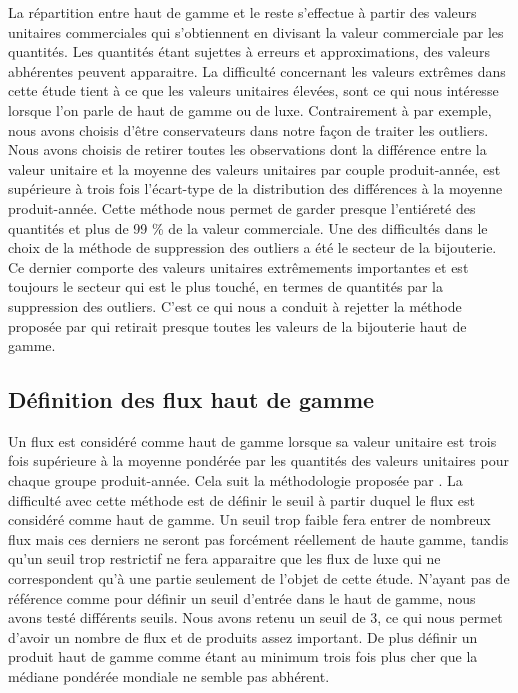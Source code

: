 \documentclass[french,10pt,a4paper]{article}
\begin{document}
La répartition entre haut de gamme et le reste s'effectue à partir des valeurs unitaires commerciales qui s'obtiennent en divisant la valeur commerciale par les quantités. Les quantités étant sujettes à erreurs et approximations, des valeurs abhérentes peuvent apparaitre. La difficulté concernant les valeurs extrêmes dans cette étude tient à ce que les valeurs unitaires élevées, sont ce qui nous intéresse lorsque l'on parle de haut de gamme ou de luxe. Contrairement à \cite{Fontagne2013} par exemple, nous avons choisis d'être conservateurs dans notre façon de traiter les outliers. Nous avons choisis de retirer toutes les observations dont la différence entre la valeur unitaire et la moyenne des valeurs unitaires par couple produit-année, est supérieure à trois fois l'écart-type de la distribution des différences à la moyenne produit-année. Cette méthode nous permet de garder presque l'entiéreté des quantités et plus de 99 \% de la valeur commerciale. Une des difficultés dans le choix de la méthode de suppression des outliers a été le secteur de la bijouterie. Ce dernier comporte des valeurs unitaires extrêmements importantes et est toujours le secteur qui est le plus touché, en termes de quantités par la suppression des outliers. C'est ce qui nous a conduit à rejetter la méthode proposée par \cite{Hallak2006} qui retirait presque toutes les valeurs de la bijouterie haut de gamme. 


\subsection{Définition des flux haut de gamme}

Un flux est considéré comme haut de gamme lorsque sa valeur unitaire est trois fois supérieure à la moyenne pondérée par les quantités des valeurs unitaires pour chaque groupe produit-année. Cela suit la méthodologie proposée par \cite{Fontagne2007}. La difficulté avec cette méthode est de définir le seuil à partir duquel le flux est considéré comme haut de gamme. Un seuil trop faible fera entrer de nombreux flux mais ces derniers ne seront pas forcément réellement de haute gamme, tandis qu'un seuil trop restrictif ne fera apparaitre que les flux de luxe qui ne correspondent qu'à une partie seulement de l'objet de cette étude. N'ayant pas de référence comme \cite{Martin2015} pour définir un seuil d'entrée dans le haut de gamme, nous avons testé différents seuils. Nous avons retenu un seuil de 3, ce qui nous permet d'avoir un nombre de flux et de produits assez important. De plus définir un produit haut de gamme comme étant au minimum trois fois plus cher que la médiane pondérée mondiale ne semble pas abhérent.
\end{document}

